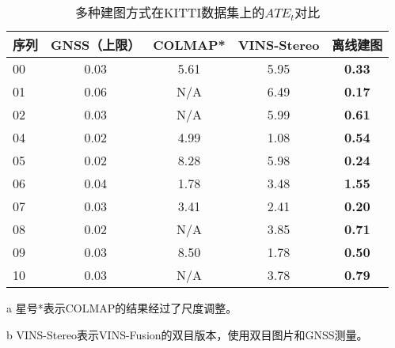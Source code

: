 \begin{table}
\centering
\begin{threeparttable}
\caption{多种建图方式在KITTI数据集上的$ATE_t$\textdownarrow{}对比}
\setlength{\tabcolsep}{5mm}
\begin{tabular}{lcccc}
\toprule
序列 & GNSS（上限） & COLMAP*\cite{schonberger2016structure} & VINS-Stereo\cite{qin2019a} & 离线建图          \\ \midrule
00 & 0.03 & 5.61   & 5.95   & \cellcolor[HTML]{FFCCC9}\textbf{0.33} \\
01 & 0.06 & N/A    & 6.49   & \cellcolor[HTML]{FFCCC9}\textbf{0.17} \\
02 & 0.03 & N/A    & 5.99   & \cellcolor[HTML]{FFCCC9}\textbf{0.61} \\
04 & 0.02 & 4.99   & 1.08   & \cellcolor[HTML]{FFCCC9}\textbf{0.54} \\
05 & 0.02 & 8.28   & 5.98   & \cellcolor[HTML]{FFCCC9}\textbf{0.24} \\
06 & 0.04 & 1.78   & 3.48   & \cellcolor[HTML]{FFCCC9}\textbf{1.55} \\
07 & 0.03 & 3.41   & 2.41   & \cellcolor[HTML]{FFCCC9}\textbf{0.20} \\
08 & 0.02 & N/A    & 3.85   & \cellcolor[HTML]{FFCCC9}\textbf{0.71} \\
09 & 0.03 & 8.50   & 1.78   & \cellcolor[HTML]{FFCCC9}\textbf{0.50} \\
10 & 0.03 & N/A    & 3.78   & \cellcolor[HTML]{FFCCC9}\textbf{0.79} \\ \bottomrule
\end{tabular}
\label{tab:map_ate}
\begin{tablenotes}
  \item [a] 星号*表示COLMAP的结果经过了尺度调整。
  \item [b] VINS-Stereo表示VINS-Fusion的双目版本，使用双目图片和GNSS测量。
\end{tablenotes}
\end{threeparttable}
\end{table}

